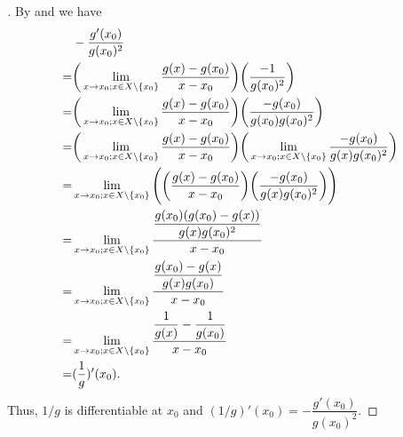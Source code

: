 \begin{proof}[]
  By  and  we have
  \begin{align*}
      & -\dfrac{g'(x_0)}{g(x_0)^2}                                                                                                                                                          \\
    = & \bigg(\lim_{x \to x_0 ; x \in X \setminus \left\lbrace x_0\right\rbrace} \dfrac{g(x) - g(x_0)}{x - x_0}\bigg) \bigg(\dfrac{-1}{g(x_0)^2}\bigg)                                                          \\
    = & \bigg(\lim_{x \to x_0 ; x \in X \setminus \left\lbrace x_0\right\rbrace} \dfrac{g(x) - g(x_0)}{x - x_0}\bigg) \bigg(\dfrac{-g(x_0)}{g(x_0) g(x_0)^2}\bigg)                                              \\
    = & \bigg(\lim_{x \to x_0 ; x \in X \setminus \left\lbrace x_0\right\rbrace} \dfrac{g(x) - g(x_0)}{x - x_0}\bigg) \bigg(\lim_{x \to x_0 ; x \in X \setminus \left\lbrace x_0\right\rbrace} \dfrac{-g(x_0)}{g(x) g(x_0)^2}\bigg) \\
    = & \lim_{x \to x_0 ; x \in X \setminus \left\lbrace x_0\right\rbrace} \Bigg(\bigg(\dfrac{g(x) - g(x_0)}{x - x_0}\bigg) \bigg(\dfrac{-g(x_0)}{g(x) g(x_0)^2}\bigg)\Bigg)                                    \\
    = & \lim_{x \to x_0 ; x \in X \setminus \left\lbrace x_0\right\rbrace} \dfrac{\dfrac{g(x_0)(g(x_0) - g(x))}{g(x) g(x_0)^2}}{x - x_0}                                                                        \\
    = & \lim_{x \to x_0 ; x \in X \setminus \left\lbrace x_0\right\rbrace} \dfrac{\dfrac{g(x_0) - g(x)}{g(x) g(x_0)}}{x - x_0}                                                                                  \\
    = & \lim_{x \to x_0 ; x \in X \setminus \left\lbrace x_0\right\rbrace} \dfrac{\dfrac{1}{g(x)} - \dfrac{1}{g(x_0)}}{x - x_0}                                                                                 \\
    = & (\dfrac{1}{g})'(x_0).
  \end{align*}
  Thus, \(1 / g\) is differentiable at \(x_0\) and \((1 / g)'(x_0) = -\dfrac{g'(x_0)}{g(x_0)^2}\).
\end{proof}

